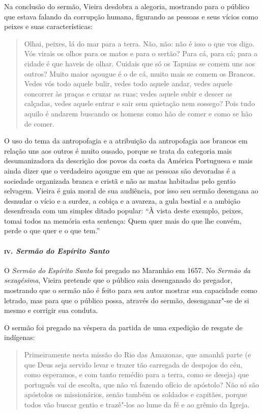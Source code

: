 Na conclusão do sermão, Vieira desdobra a alegoria, mostrando para o
público que estava falando da corrupção humana, figurando as pessoas e
seus vícios como peixes e suas características:

\begin{quote}
Olhai, peixes, lá do mar para a terra. Não, não: não é isso o que vos
digo. Vós virais os olhos para os matos e para o sertão? Para cá, para
cá; para a cidade é que haveis de olhar. Cuidais que só os Tapuias se
comem uns aos outros? Muito maior açougue é o de cá, muito mais se comem
os Brancos. Vedes vós todo aquele bulir, vedes todo aquele andar, vedes
aquele concorrer às praças e cruzar as ruas; vedes aquele subir e descer
as calçadas, vedes aquele entrar e sair sem quietação nem sossego? Pois
tudo aquilo é andarem buscando os homens como hão de comer e como se hão
de comer.
\end{quote}

O uso do tema da antropofagia e a atribuição da antropofagia aos brancos
em relação uns aos outros é muito ousado, porque se trata da categoria
mais desumanizadora da descrição dos povos da costa da América
Portuguesa e mais ainda dizer que o verdadeiro açougue em que as pessoas
são devoradas é a sociedade organizada branca e cristã e não as matas
habitadas pelo gentio selvagem. Vieira é guia moral de sua audiência,
por isso seu sermão desengana ao desnudar o vício e a surdez, a cobiça e
a avareza, a gula bestial e a ambição desenfreada com um simples ditado
popular: ``À vista deste exemplo, peixes, tomai todos na memória esta
sentença: Quem quer mais do que lhe convém, perde o que quer e o que
tem.''

\paragraph{\textsc{iv}. \emph{Sermão do Espírito Santo}}

O \emph{Sermão do Espírito Santo} foi pregado no Maranhão em 1657. No
\emph{Sermão da sexagésima}, Vieira pretende que o público saia
desenganado do pregador, mostrando que o sermão não é feito para seu
autor mostrar sua capacidade como letrado, mas para que o público possa,
através do sermão, desenganar"-se de si mesmo e corrigir sua conduta.

O sermão foi pregado na véspera da partida de uma expedição de resgate
de indígenas:

\begin{quote}
Primeiramente nesta missão do Rio das Amazonas, que amanhã parte (e
que Deus seja servido levar e trazer tão carregada de despojos do céu,
como esperamos, e com tanto remédio para a terra, como se deseja) que
português vai de escolta, que não vá fazendo ofício de apóstolo? Não só
são apóstolos os missionários, senão também os soldados e capitães,
porque todos vão buscar gentio e trazê"-los ao lume da fé e ao grêmio da
Igreja.
\end{quote}

